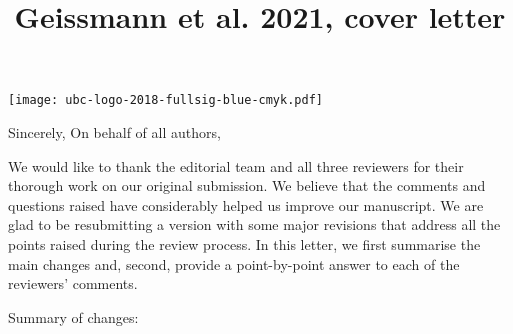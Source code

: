 \documentclass[12pt,a4paper,roman]{moderncv}
\title{Geissmann et al. 2021, cover letter}
\begin{document}
\begin{minipage}[t]{\textwidth}
\texttt{[image: ubc-logo-2018-fullsig-blue-cmyk.pdf]}
\end{minipage}

\opening{\vspace*{-1em}}
\closing{Sincerely, On behalf of all authors, }{\vspace*{-2em}}
\makelettertitle

\justifying




\vspace{1.5cm}



We would like to thank the editorial team and all three reviewers for their thorough work on our original submission. We believe that the comments and questions raised have considerably helped us improve our manuscript. We are glad to be resubmitting a version with some major revisions that address all the points raised during the review process. In this letter, we first summarise the main changes and, second, provide a point-by-point answer to each of the reviewers’ comments.

Summary of changes:
\end{document}

